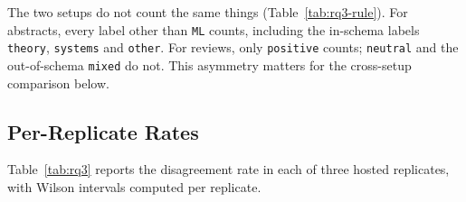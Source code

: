\documentclass[11pt]{article}
\begin{document}
The two setups do not count the same things (Table~\ref{tab:rq3-rule}). For
abstracts, every label other than \texttt{ML} counts, including the in-schema
labels \texttt{theory}, \texttt{systems} and \texttt{other}. For reviews, only
\texttt{positive} counts; \texttt{neutral} and the out-of-schema
\texttt{mixed} do not. This asymmetry matters for the cross-setup comparison
below.

\begin{table}[t]
\centering
\caption{Operational disagreement rules (RQ3). Both are frozen in
  \texttt{configs/pipelines.py}.}
\label{tab:rq3-rule}
\smallskip
\small
{}
\end{table}

\subsection{Per-Replicate Rates}

Table~\ref{tab:rq3} reports the disagreement rate in each of three hosted
replicates, with Wilson intervals computed per replicate.

\begin{table}[t]
\centering
\caption{Criterion-disagreement rate among filter-admitted rows (RQ3), per
  replicate, hosted \texttt{gpt-4o-mini}. Wilson 95\% intervals. Spread is the
  maximum minus the minimum replicate rate.}
\label{tab:rq3}
\smallskip
\small
{}
\end{table}
\end{document}
